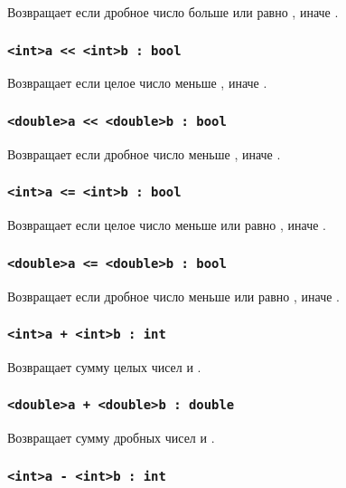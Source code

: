 \documentclass[a4paper, 14pt]{extarticle}
\begin{document}
Возвращает \true{} если дробное число  больше или равно , иначе \false{}.

\subsubsection{\lstinline`<int>a << <int>b : bool`}

Возвращает \true{} если целое число  меньше , иначе \false{}.

\subsubsection{\lstinline`<double>a << <double>b : bool`}

Возвращает \true{} если дробное число  меньше , иначе \false{}.

\subsubsection{\lstinline`<int>a <= <int>b : bool`}

Возвращает \true{} если целое число  меньше или равно , иначе \false{}.

\subsubsection{\lstinline`<double>a <= <double>b : bool`}

Возвращает \true{} если дробное число  меньше или равно , иначе \false{}.


\subsubsection{\lstinline`<int>a + <int>b : int`}

Возвращает сумму целых чисел  и .

\subsubsection{\lstinline`<double>a + <double>b : double`}

Возвращает сумму дробных чисел  и .

\subsubsection{\lstinline`<int>a - <int>b : int`}
\end{document}
